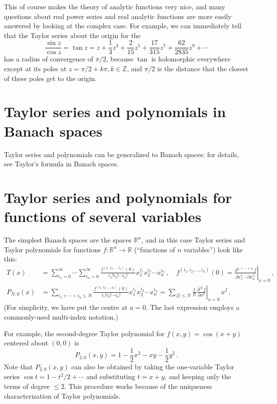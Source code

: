 \documentclass[12pt]{article}
\newcommand{\real}{\mathbb{R}}
\providecommand{\abs}[1]{\lvert#1\rvert}
\begin{document}
This of course makes the theory of analytic functions very nice, and
many questions about real power series and real analytic functions are more easily  
answered by looking at the complex case.
For example, we can immediately tell that 
the Taylor series about the origin for the 
\[
\frac{\sin z}{\cos z} = \tan z = z+\frac{1}{3} z^3+\frac{2}{15}z^5+ \frac{17}{315}z^7+ \frac{62}{2835} z^9+ \dotsb
\]
has a radius of convergence of $\pi/2$,
because $\tan$ is holomorphic everywhere except at its poles at
$z = \pi/2 +k\pi, k \in \mathbb{Z}$, 
and $\pi/2$ is the distance that the closest of these poles get to the origin.

\section{Taylor series and polynomials in Banach spaces}
Taylor series and polynomials can be generalized to Banach spaces:
for details, see Taylor's formula in Banach spaces.

\section{Taylor series and polynomials for functions of several variables}
The simplest Banach spaces are the spaces $\real^n$,
and in this case Taylor series and Taylor polynomials for functions
$f \colon \real^n \to \real$ (``functions of $n$ variables'')
look like this:
\begin{align*}
 T(x) &= \sum_{i_1=0}^\infty \cdots \sum_{i_n=0}^\infty 
\frac{f^{(i_1,i_2,\ldots,i_n)}(0)}{i_1!i_2!\cdots i_n!}x_1^{i_1}x_2^{i_2} \cdots x_n^{i_n}
\,,
\quad
f^{(i_1,i_2,\ldots,i_n)}(0) = \left.\frac{\partial^{i_1+\dotsb+i_n} f}{\partial x_1^{i_1} \cdots \partial x_n^{i_n}}\right|_{x=0}\,,
\\
P_{N,0}(x) &= \sum_{i_1 + \dotsb + i_n  \leq N}
\frac{f^{(i_1, i_2, \ldots, i_n)}(0)}{i_1!i_2!\cdots i_n!}
  x_1^{i_1}x_2^{i_2} \cdots x_n^{i_n}  = \sum_{\abs{I} \leq N} \frac{1}{I!} \left.\frac{\partial^{\abs{I}} f}{\partial x^I}\right|_{x=0} \, x^I\,.
\end{align*}
(For simplicity, we have put the centre at $a= 0$. 
The last expression employs a commonly-used multi-index notation.)

For example, the second-degree Taylor polynomial for $f(x,y) = \cos(x+y)$
centered about $(0,0)$
is
\[
P_{2,0}(x,y) = 1 - \frac{1}{2} x^2  - xy -   \frac{1}{2}y^2\,.
\]
Note that $P_{2,0}(x,y)$ can also be obtained by
taking the one-variable Taylor series $\cos t = 1 - t^2 / 2 + \dotsb $ and substituting
$t = x+y$, and keeping only the terms of degree $\leq 2$.
This procedure works because of the uniqueness characterization of Taylor polynomials.
\end{document}
